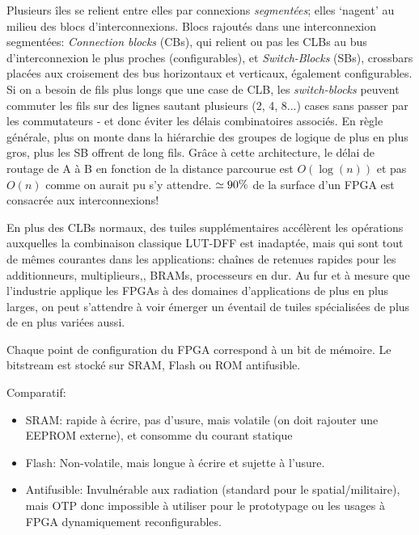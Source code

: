 Plusieurs îles se relient entre elles par connexions \emph{segmentées}; elles `nagent' au milieu des blocs d'interconnexions. Blocs rajoutés dans une interconnexion segmentées: \emph{Connection blocks} (CBs), qui relient ou pas les CLBs au bus d'interconnexion le plus proches (configurables), et \emph{Switch-Blocks} (SBs), crossbars placées aux croisement des bus horizontaux et verticaux, également configurables. Si on a besoin de fils plus longs que une case de CLB, les \emph{switch-blocks} peuvent commuter les fils sur des lignes sautant plusieurs (2, 4, 8...) cases sans passer par les commutateurs - et donc éviter les délais combinatoires associés. En règle générale, plus on monte dans la hiérarchie des groupes de logique de plus en plus gros, plus les SB offrent de long fils. Grâce à cette architecture, le délai de routage de A à B en fonction de la distance parcourue est $O(\log(n))$ et pas $O(n)$ comme on aurait pu s'y attendre. $\simeq 90\%$ de la surface d'un FPGA est consacrée aux interconnexions!


En plus des CLBs normaux, des tuiles supplémentaires accélèrent les opérations auxquelles la combinaison classique LUT-DFF est inadaptée, mais qui sont tout de mêmes courantes dans les applications: chaînes de retenues rapides pour les additionneurs, multiplieurs,, BRAMs, processeurs en dur. Au fur et à mesure que l'industrie applique les FPGAs à des domaines d'applications de plus en plus larges, on peut s'attendre à voir émerger un éventail de tuiles spécialisées de plus de en plus variées aussi.


Chaque point de configuration du FPGA correspond à un bit de mémoire. Le bitstream est stocké sur SRAM, Flash ou ROM antifusible.

Comparatif:

\begin{itemize}
	\item SRAM: rapide à écrire, pas d'usure, mais volatile (on doit rajouter une EEPROM externe), et consomme du courant statique
	\item Flash: Non-volatile, mais longue à écrire et sujette à l'usure.
	\item Antifusible: Invulnérable aux radiation (standard pour le spatial/militaire), mais OTP donc impossible à utiliser pour le prototypage ou les usages à FPGA dynamiquement reconfigurables.
\end{itemize}

